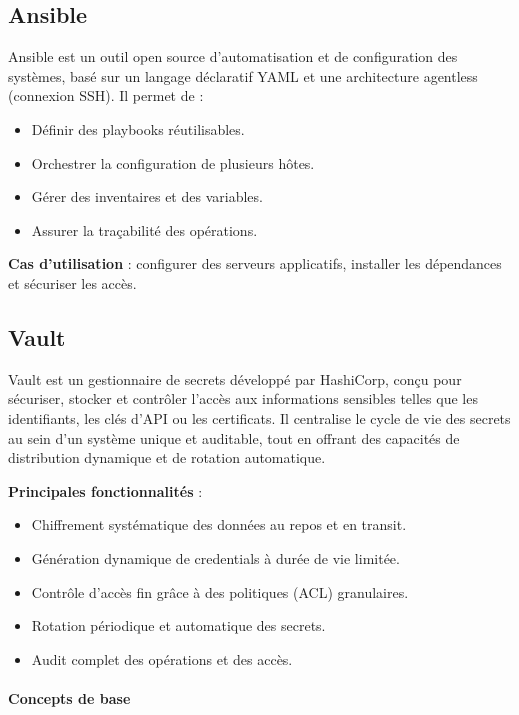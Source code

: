 \subsection{Ansible}

Ansible est un outil open source d’automatisation et de configuration des systèmes, basé sur un langage déclaratif YAML et une architecture agentless (connexion SSH). Il permet de :
\begin{itemize}
	\item Définir des playbooks réutilisables.
	\item Orchestrer la configuration de plusieurs hôtes.
	\item Gérer des inventaires et des variables.
	\item Assurer la traçabilité des opérations.
\end{itemize}

\textbf{Cas d’utilisation} : configurer des serveurs applicatifs, installer les dépendances et sécuriser les accès.

\subsection{Vault}

Vault est un gestionnaire de secrets développé par HashiCorp, conçu pour sécuriser, stocker et contrôler l’accès aux informations sensibles telles que les identifiants, les clés d’API ou les certificats. Il centralise le cycle de vie des secrets au sein d’un système unique et auditable, tout en offrant des capacités de distribution dynamique et de rotation automatique.

\textbf{Principales fonctionnalités} :
\begin{itemize}
	\item Chiffrement systématique des données au repos et en transit.
	\item Génération dynamique de credentials à durée de vie limitée.
	\item Contrôle d’accès fin grâce à des politiques (ACL) granulaires.
	\item Rotation périodique et automatique des secrets.
	\item Audit complet des opérations et des accès.
\end{itemize}

\paragraph{Concepts de base}

